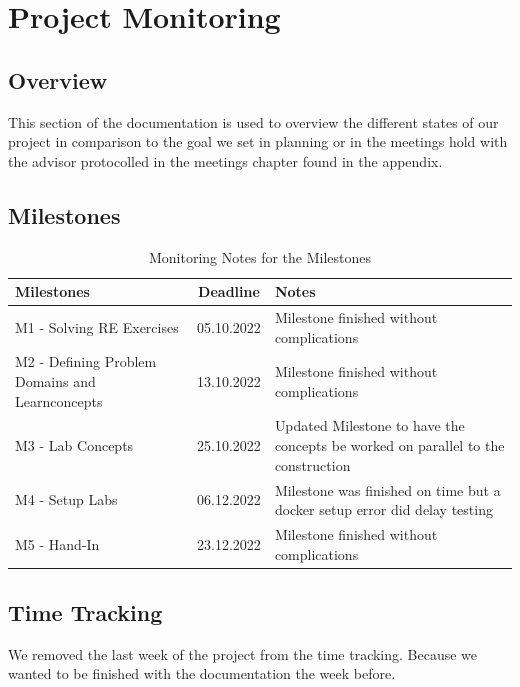 \section{Project Monitoring}
\subsection{Overview}
This section of the documentation is used to overview the different states of our project in comparison to the goal we set in planning or in the meetings hold with the advisor protocolled in the meetings chapter found in the appendix.

\subsection{Milestones}

\begin{table}[H]
    \centering
    \begin{tabular}[]{|| p{5cm} | c | p{6.2cm} ||}
        \hline
        Milestones & Deadline & Notes \\
        \hline \hline
        M1 - Solving RE Exercises & 05.10.2022 & Milestone finished without complications \\
        \hline
        M2 - Defining Problem Domains and Learnconcepts& 13.10.2022 & Milestone finished without complications \\
        \hline
        M3 - Lab Concepts & 25.10.2022 & Updated Milestone to have the concepts be worked on parallel to the construction \\
        \hline
        M4 - Setup Labs & 06.12.2022 & Milestone was finished on time but a docker setup error did delay testing\\
        \hline
        M5 - Hand-In & 23.12.2022 & Milestone finished without complications \\
        \hline
    \end{tabular}
    \caption{Monitoring Notes for the Milestones}
    \label{milestones_monitoring_table}
\end{table}

\subsection{Time Tracking}

We removed the last week of the project from the time tracking. Because we wanted to be finished with the documentation the week before.

